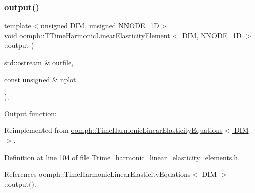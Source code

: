 \mbox{\label{classoomph_1_1TTimeHarmonicLinearElasticityElement_a6a11b59f4e32f9ce2bc7326dff35d8fb}} 
\subsubsection{\texorpdfstring{output()}{output()}\hspace{0.1cm}{\footnotesize\ttfamily [2/4]}}
{\footnotesize\ttfamily template$<$unsigned D\+IM, unsigned N\+N\+O\+D\+E\+\_\+1D$>$ \\
void \hyperlink{classoomph_1_1TTimeHarmonicLinearElasticityElement}{oomph\+::\+T\+Time\+Harmonic\+Linear\+Elasticity\+Element}$<$ D\+IM, N\+N\+O\+D\+E\+\_\+1D $>$\+::output (\begin{DoxyParamCaption}\item[{std\+::ostream \&}]{outfile,  }\item[{const unsigned \&}]{nplot }\end{DoxyParamCaption})\hspace{0.3cm}{\ttfamily [inline]}, {\ttfamily [virtual]}}



Output function\+: 



Reimplemented from \hyperlink{classoomph_1_1TimeHarmonicLinearElasticityEquations_a5363121911a4418e2bfa707e02e2adc4}{oomph\+::\+Time\+Harmonic\+Linear\+Elasticity\+Equations$<$ D\+I\+M $>$}.



Definition at line 104 of file Ttime\+\_\+harmonic\+\_\+linear\+\_\+elasticity\+\_\+elements.\+h.



References oomph\+::\+Time\+Harmonic\+Linear\+Elasticity\+Equations$<$ D\+I\+M $>$\+::output().

\mbox{\label{classoomph_1_1TTimeHarmonicLinearElasticityElement_ac0124efd664afd05141495c072587d6a}} 
